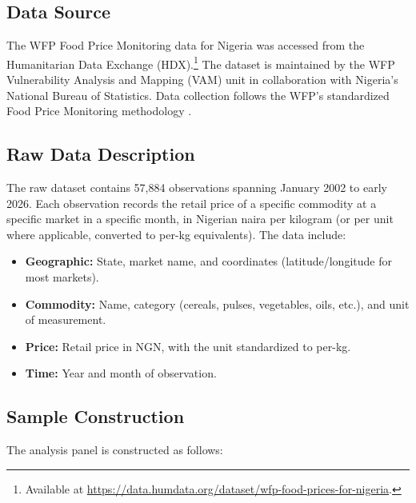 \documentclass[12pt]{article}
\begin{document}
\subsection{Data Source}

The WFP Food Price Monitoring data for Nigeria was accessed from the Humanitarian Data Exchange (HDX).\footnote{Available at \url{https://data.humdata.org/dataset/wfp-food-prices-for-nigeria}.} The dataset is maintained by the WFP Vulnerability Analysis and Mapping (VAM) unit in collaboration with Nigeria's National Bureau of Statistics. Data collection follows the WFP's standardized Food Price Monitoring methodology \citep{wfp2024hdx}.

\subsection{Raw Data Description}

The raw dataset contains 57,884 observations spanning January 2002 to early 2026. Each observation records the retail price of a specific commodity at a specific market in a specific month, in Nigerian naira per kilogram (or per unit where applicable, converted to per-kg equivalents). The data include:

\begin{itemize}
\item \textbf{Geographic:} State, market name, and coordinates (latitude/longitude for most markets).
\item \textbf{Commodity:} Name, category (cereals, pulses, vegetables, oils, etc.), and unit of measurement.
\item \textbf{Price:} Retail price in NGN, with the unit standardized to per-kg.
\item \textbf{Time:} Year and month of observation.
\end{itemize}

\subsection{Sample Construction}

The analysis panel is constructed as follows:
\end{document}
